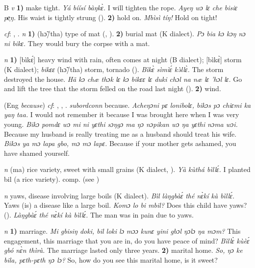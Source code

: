 \begin{letter}{B}
 \textit{v} \textbf{1)} make tight. \textit{Yá bíísí bàŋkɛ̀.} I will tighten the rope. \textit{Ayeŋ wɔ lɛ che bisiɛ pe̹ŋ.} His waist is tightly strung (\citealt{Pichl1967}). \textbf{2)} hold on. \textit{Mbìsì tíŋ!} Hold on tight!

 \textit{cf}: , . \textit{n} \textbf{1)} (hɔ̃/tha) type of mat (\citealt{Pichl1967}, \citealt{Sumner1921}). \textbf{2)} burial mat (K dialect). \textit{Pɔ bia kɔ kɔŋ nɔ ni bikɛ.} They would bury the corpse with a mat.

 \textit{n} \textbf{1)} [bìkɛ́] heavy wind with rain, often comes at night (B dialect); [bìkɛ̀] storm (K dialect); \textit{bikɛɛ} (hɔ̃/tha) storm, tornado (\citealt{Pichl1967}). \textit{Bìkɛ̀ sìmìɛ́ kə̀llɛ̀.} The storm destroyed the house. \textit{Hã kɔ chæ thɔk lɛ kɔ bikɛɛ lɛ duki chɔl na næ lɛ 'hɔl lɛ.} Go and lift the tree that the storm felled on the road last night (\citealt{Pichl1967}). \textbf{2)} wind. 

 (Eng \textit{because}) \textit{cf}: , , . \textit{subordconn} because. \textit{Acheŋɔni pɛ lonibolɛ, bikɔs pɔ chiɛmi ka yaŋ taa.} I would not remember it because I was brought here when I was very young. \textit{Bikɔ pomdɛ wɔ mi ni yɛthi sɔŋgɔ ma ŋɔ nɔpikan wɔ ŋa yɛthi nɔma wɔi.} Because my husband is really treating me as a husband should treat his wife. \textit{Bikɔs ya mɔ lapa gbo, mɔ mɔ lapɛ.} Because if your mother gets ashamed, you have shamed yourself.

 \textit{n} (ma) rice variety, sweet with small grains (K dialect, \citealt{Pichl1967}). \textit{Yà kùthá bìllɛ́.} I planted bil (a rice variety). comp.  (see ) 

 \textit{n} yaws, disease involving large boils (K dialect). \textit{Bìl làŋgbàɛ́ thé nɛ̀kí kà bìllɛ́.} Yaws (is) a disease like a large boil. \textit{Komɔ lo bi mbil?} Does this child have yaws? (\citealt{Pichl1967}). \textit{Làŋgbàɛ́ thé nɛ̀kí kà bìllɛ́.} The man was in pain due to yaws.

 \textit{n} \textbf{1)} marriage. \textit{Mi gbisiŋ doki, bil loki lɔ mɔɔ kunɛ yini gbɔl ŋɔlɔ ŋa mɔm?} This engagement, this marriage that you are in, do you have peace of mind? \textit{Bìllɛ̀ kùèɛ́ gbó nɛ̀n thìrà.} The marriage lasted only three years. \textbf{2)} marital home. \textit{So, ŋɔ ke bila, pɛth-pɛth ŋɔ lɔ?} So, how do you see this marital home, is it sweet?


\end{letter}
